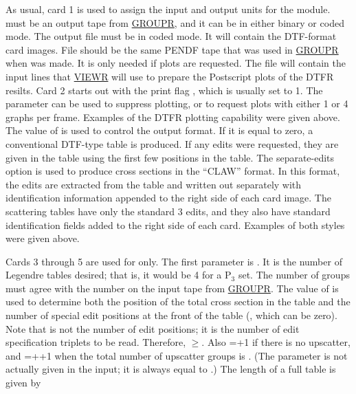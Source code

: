 As usual, card 1 is used to assign the input and output units
for the module.   must be an output tape from
\hyperlink{sGROUPRhy}{GROUPR},
and it can be in either binary or coded mode.  The output
file  must be in coded mode.  It will contain the
DTF-format card images.  File  should be the same PENDF
tape that was used in \hyperlink{sGROUPRhy}{GROUPR}
when  was made.  It is
only needed if plots are requested.  The  file will
contain the input lines that
\hyperlink{sVIEWRhy}{VIEWR} will use to prepare the Postscript
plots of the DTFR resilts.  Card 2 starts out with the print flag
, which is usually set to 1.  The parameter 
can be used to suppress plotting, or to request plots with either
1 or 4 graphs per frame.  Examples of the DTFR plotting capability
were given above.  The value of  is used to control the
output format.  If it is equal to zero, a conventional DTF-type table
is produced.  If any edits were requested, they are given in the
table using the first few positions in the table.  The separate-edits
option is used to produce cross sections in the ``CLAW'' format.
In this format, the edits are extracted from the table and
written out separately with identification information appended
to the right side of each card image.  The scattering tables
have only the standard 3 edits, and they also have standard
identification fields added to the right side of each card.
Examples of both styles were given above.

Cards 3 through 5 are used for  only.  The first
parameter is .  It is the number of Legendre tables
desired; that is, it would be 4 for a P$_3$ set.  The number of
groups  must agree with the number on the input tape
from \hyperlink{sGROUPRhy}{GROUPR}.  The value of
 is used to determine both
the position of the total cross section in the table and the number
of special edit positions at the front of the table (,
which can be zero).  Note that  is not the number of
edit positions; it is the number of edit specification triplets
to be read.  Therefore, $\ge$.
Also =+1 if there is no upscatter, and
=++1 when the total number of upscatter
groups is .  (The parameter  is not actually given
in the input; it is always equal to .)
The length of a full table is given by

